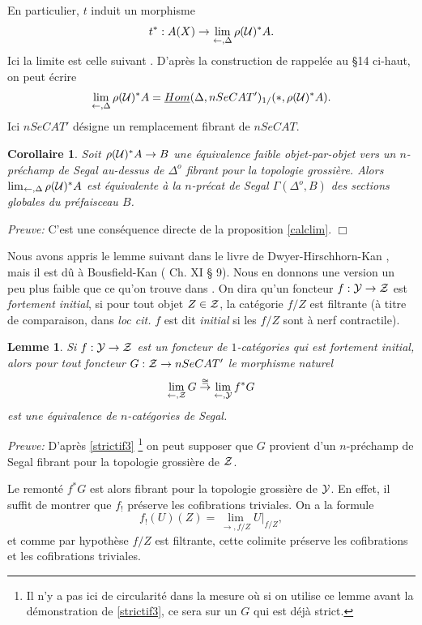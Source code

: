 \documentclass[12pt]{article}
\newcommand{\eop}{\hfill $\Box$\vspace{.1in}}
\newtheorem{lemme}[lemma]{Lemme}
\newtheorem{corollaire}[lemma]{Corollaire}
\newcommand{\Uu}{{\cal U}}
\newcommand{\Yy}{{\cal Y}}
\newcommand{\Zz}{{\cal Z}}
\begin{document}
En particulier, $t$ induit un morphisme
$$
t^{\ast} : A(X) \rightarrow \lim _{\leftarrow , \Delta} \rho (\Uu )^{\ast }A.
$$
Ici la limite est celle suivant
\cite{limits}. D'apr\`es la construction de
\cite{limits} rappel\'ee au \S 14 ci-haut, on peut \'ecrire
$$
\lim _{\leftarrow , \Delta} \rho (\Uu )^{\ast }A
= \underline{Hom}(\Delta , nSeCAT')_{1/}(\ast , \rho (\Uu )^{\ast }A).
$$
Ici $nSeCAT'$ d\'esigne un remplacement fibrant de $nSeCAT$.

\begin{corollaire}
Soit $\rho (\Uu )^{\ast }A\rightarrow B$ une \'equivalence faible
objet-par-objet
vers un $n$-pr\'echamp de Segal au-dessus de $\Delta ^o$ fibrant pour la
topologie
grossi\`ere. Alors
\newline
$\lim _{\leftarrow , \Delta} \rho (\Uu )^{\ast }A$
est \'equivalente \`a la $n$-pr\'ecat de
Segal $\Gamma (\Delta ^o, B)$ des sections globales du pr\'efaisceau $B$.
\end{corollaire}
{\em Preuve:}
C'est une cons\'equence directe de la proposition \ref{calclim}.
\eop

Nous avons appris le lemme suivant dans le livre de Dwyer-Hirschhorn-Kan
\cite{DHK}, mais il est d\^u \`a Bousfield-Kan (\cite{BousfieldKan} Ch. XI \S
9).
Nous en donnons une version un peu plus faible que ce qu'on trouve dans
\cite{BousfieldKan} \cite{DHK}. On dira qu'un foncteur $f:\Yy \rightarrow \Zz$
est  {\em fortement initial}, si pour tout objet $Z\in \Zz$, la cat\'egorie
$f/Z$ est filtrante (\`a titre de comparaison, dans {\em loc cit.} $f$ est
dit {\em
initial} si les $f/Z$ sont \`a nerf contractile).


\begin{lemme}
Si $f:\Yy \rightarrow \Zz$ est un foncteur de $1$-cat\'egories qui est fortement
initial, alors pour tout foncteur $G: \Zz \rightarrow nSeCAT'$ le morphisme
naturel  $$ \lim _{\leftarrow , \Zz } G \stackrel{\cong}{\rightarrow}
\lim _{\leftarrow , \Yy } f^{\ast}G
$$
est une
\'equivalence de $n$-cat\'egories de Segal.
\end{lemme}
{\em Preuve:}
D'apr\`es \ref{strictif3}
\footnote{Il n'y a pas ici
de circularit\'e dans la mesure o\`u si on utilise ce lemme
avant la d\'emonstration de \ref{strictif3}, ce sera sur un $G$ qui est d\'ej\`a
strict.}
on peut supposer  que
$G$ provient d'un  $n$-pr\'echamp de Segal fibrant pour la topologie
grossi\`ere de $\Zz$.

Le remont\'e $f^{\ast}G$ est alors fibrant pour la topologie grossi\`ere de
$\Yy$.  En effet, il suffit de montrer que $f_!$ pr\'eserve les cofibrations
triviales. On a la formule
$$
f_!(U)(Z)= \lim _{\rightarrow , f/Z} U|_{f/Z},
$$
et comme par hypoth\`ese $f/Z$ est filtrante, cette colimite pr\'eserve les
cofibrations et les cofibrations triviales.
\end{document}
